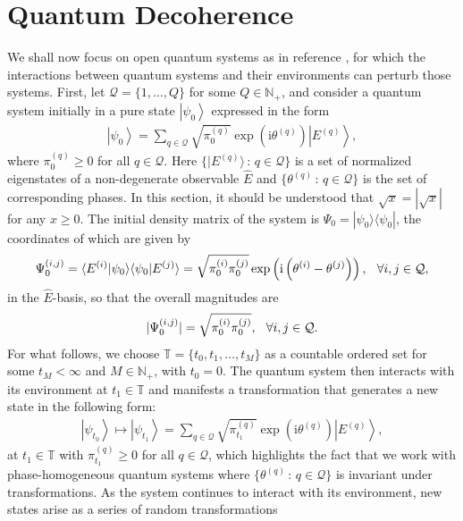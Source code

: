 \documentclass[12pt,a4paper]{article}
\def\N{\mathbb{N}}
\def\T{\mathbb{T}}
\begin{document}
\section{Quantum Decoherence}
We shall now focus on open quantum systems as in reference \cite{Brody Hughston 2025}, for which the interactions between quantum systems and their environments can perturb those systems. First, let $\mathcal{Q} = \{1,\ldots,Q\}$ for some $Q\in\N_+$, and consider a quantum system initially in a pure state $\left|\psi_0\right\rangle$ expressed in the form
%
\begin{align}
\left|\psi_0\right\rangle = \sum_{q\in\mathcal{Q}} \sqrt{\pi_0^{(q)}} \exp\left( \text{i} \theta^{(q)} \right) \left|E^{(q)}\right\rangle, 
\end{align}
%
where $\pi_0^{(q)}\geq 0$ for all $q\in\mathcal{Q}$. Here $\{ |E^{(q)}\rangle \,: \, q\in \mathcal{Q} \}$ is a set of normalized eigenstates of a non-degenerate observable $\hat{E}$ and $\{ \theta^{(q)} \,: \, q\in \mathcal{Q} \}$ is the set of corresponding phases. In this section, it should be understood that $\sqrt{x}=|\sqrt{x}|$ for any $x\geq 0$. The initial density matrix of the system is $\Psi_0 =  |\psi_0\rangle \langle\psi_0|$, the coordinates of which are given by
\begin{align}
\Psi_0^{(i,j)} = \langle E^{(i)} |\psi_0\rangle \langle \psi_0| E^{(j)} \rangle = \sqrt{\pi_0^{(i)}\pi_0^{(j)}}\exp\left( \text{i}\left( \theta^{(i)} - \theta^{(j)} \right) \right),   \hspace{0.1in} \text{$\forall i,j\in \mathcal{Q}$},
\end{align}
in the $\hat{E}$-basis, so that the overall magnitudes are 
\begin{align}
|\Psi_0^{(i,j)}| = \sqrt{\pi_0^{(i)}\pi_0^{(j)}}, \hspace{0.1in} \text{$\forall i,j\in \mathcal{Q}$}. \label{consistentinitialization}
\end{align}
For what follows, we choose $\T = \{t_0, t_1, \ldots, t_M\}$ as a countable ordered set for some $t_M < \infty$ and $M\in\N_+$, with $t_0 = 0$. The quantum system then interacts with its environment at $t_1\in\T$ and manifests a transformation that generates a new state in the following form:
\begin{align}
\left|\psi_{t_{0}}\right\rangle \mapsto \left|\psi_{t_1}\right\rangle = \sum_{q\in\mathcal{Q}} \sqrt{\pi_{t_1}^{(q)}} \exp\left( \text{i} \theta^{(q)} \right) \left|E^{(q)}\right\rangle, 
\end{align}
at $t_1\in\T$ with $\pi_{t_1}^{(q)}\geq 0$ for all $q\in\mathcal{Q}$, which highlights the fact that we work with phase-homogeneous quantum systems where $\{ \theta^{(q)} \,: \, q\in \mathcal{Q} \}$ is invariant under transformations. As the system continues to interact with its environment, new states arise as a series of random transformations
\end{document}
